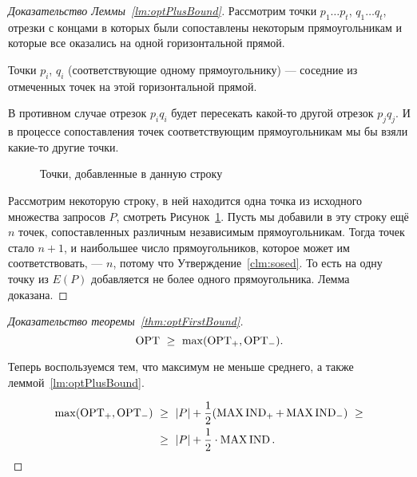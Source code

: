 \begin{proof}[Доказательство Леммы~\ref{lm:optPlusBound}]
Рассмотрим точки $p_1 \ldots p_t$, $q_1 \ldots q_t$, отрезки с концами в которых были сопоставлены некоторым прямоугольникам и которые все оказались на одной горизонтальной прямой.

\begin{clm} \label{clm:sosed}
	Точки $p_i$, $q_i$ (соответствующие одному прямоугольнику) — соседние из отмеченных точек на этой горизонтальной прямой.
\end{clm}

В противном случае отрезок $p_i q_i$ будет пересекать какой-то другой отрезок $p_j q_j$. И в процессе сопоставления точек соответствующим прямоугольникам мы бы взяли какие-то другие точки.

\begin{figure}[h] \centering
\caption{Точки, добавленные в данную строку}
\label{fig:nPoints}
\end{figure}

Рассмотрим некоторую строку, в ней находится одна точка из исходного множества запросов $P$, смотреть Рисунок~\ref{fig:nPoints}. Пусть мы добавили в эту строку ещё $n$ точек, сопоставленных различным независимым прямоугольникам. Тогда точек стало $n+1$, и наибольшее число прямоугольников, которое может им соответствовать, — $n$, потому что Утверждение~\ref{clm:sosed}. То есть на одну точку из $E(P)$ добавляется не более одного прямоугольника. Лемма доказана.
\end{proof}

\begin{proof}[Доказательство теоремы~\ref{thm:optFirstBound}]
\begin{equation*}
	\operatorname{OPT}\ \ge\ \max ( \operatorname{OPT}_+, \operatorname{OPT}_- ).
\end{equation*} \vspace{-8mm}

Теперь воспользуемся тем, что максимум не меньше среднего, а также леммой~\ref{lm:optPlusBound}. \vspace{-5mm}

\begin{align*}
	\max ( \operatorname{OPT}_+, \operatorname{OPT}_- )\ & \ge\ |P| + \frac{1}{2}
	( \operatorname{MAX\,IND}_+ + \operatorname{MAX\,IND}_- )\ \ge \\
	& \ge\ |P| + \frac{1}{2} \cdot \operatorname{MAX\,IND}.
\end{align*}

\vspace{-8mm} \end{proof}